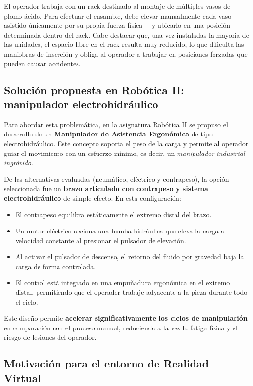 El operador trabaja con un rack destinado al montaje de múltiples vasos de plomo-ácido. Para efectuar el ensamble, debe elevar manualmente cada vaso ---asistido únicamente por su propia fuerza física--- y ubicarlo en una posición determinada dentro del rack. Cabe destacar que, una vez instaladas la mayoría de las unidades, el espacio libre en el rack resulta muy reducido, lo que dificulta las maniobras de inserción y obliga al operador a trabajar en posiciones forzadas que pueden causar accidentes.

\subsection{Solución propuesta en Robótica II: manipulador electrohidráulico}

Para abordar esta problemática, en la asignatura Robótica II se propuso el desarrollo de un \textbf{Manipulador de Asistencia Ergonómica} de tipo electrohidráulico. Este concepto soporta el peso de la carga y permite al operador guiar el movimiento con un esfuerzo mínimo, es decir, un \textit{manipulador industrial ingrávido}.

De las alternativas evaluadas (neumático, eléctrico y contrapeso), la opción seleccionada fue un \textbf{brazo articulado con contrapeso y sistema electrohidráulico} de simple efecto. En esta configuración:

\begin{itemize}
    \item El contrapeso equilibra estáticamente el extremo distal del brazo.
    \item Un motor eléctrico acciona una bomba hidráulica que eleva la carga a velocidad constante al presionar el pulsador de elevación.
    \item Al activar el pulsador de descenso, el retorno del fluido por gravedad baja la carga de forma controlada.
    \item El control está integrado en una empuñadura ergonómica en el extremo distal, permitiendo que el operador trabaje adyacente a la pieza durante todo el ciclo.
\end{itemize}

Este diseño permite \textbf{acelerar significativamente los ciclos de manipulación} en comparación con el proceso manual, reduciendo a la vez la fatiga física y el riesgo de lesiones del operador.

\subsection{Motivación para el entorno de Realidad Virtual}


